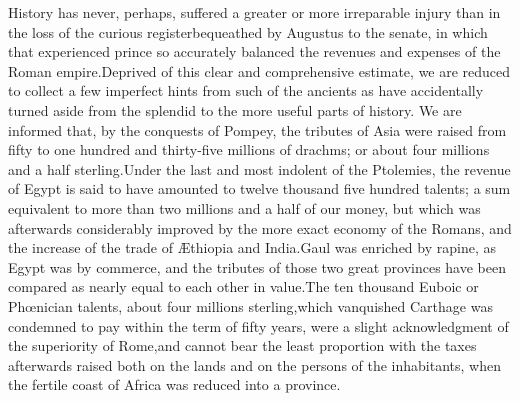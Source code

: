 

History has never, perhaps, suffered a greater or more
irreparable injury than in the loss of the curious register\footnotemark[841]
bequeathed by Augustus to the senate, in which that experienced
prince so accurately balanced the revenues and expenses of the
Roman empire.\footnotemark[85] Deprived of this clear and comprehensive
estimate, we are reduced to collect a few imperfect hints from
such of the ancients as have accidentally turned aside from the
splendid to the more useful parts of history. We are informed
that, by the conquests of Pompey, the tributes of Asia were
raised from fifty to one hundred and thirty-five millions of
drachms; or about four millions and a half sterling.\footnotemark[86] \footnotemark[861] Under
the last and most indolent of the Ptolemies, the revenue of Egypt
is said to have amounted to twelve thousand five hundred talents;
a sum equivalent to more than two millions and a half of our
money, but which was afterwards considerably improved by the more
exact economy of the Romans, and the increase of the trade of
Æthiopia and India.\footnotemark[87] Gaul was enriched by rapine, as Egypt was
by commerce, and the tributes of those two great provinces have
been compared as nearly equal to each other in value.\footnotemark[88] The ten
thousand Euboic or Phœnician talents, about four millions
sterling,\footnotemark[89] which vanquished Carthage was condemned to pay
within the term of fifty years, were a slight acknowledgment of
the superiority of Rome,\footnotemark[90] and cannot bear the least proportion
with the taxes afterwards raised both on the lands and on the
persons of the inhabitants, when the fertile coast of Africa was
reduced into a province.\footnotemark[91]




